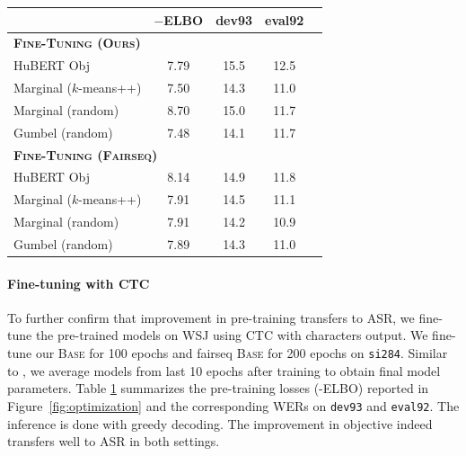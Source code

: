 \begin{table}[t]
\centering
{}
\label{tab:ctc}
\begin{threeparttable}
\footnotesize
\begin{tabularx}{0.94\linewidth}{lcccc}
  \toprule
     &$-$ELBO &dev93 &eval92\\[1pt]
  \midrule
  \multicolumn{3}{l}{\textbf{\textsc{Fine-Tuning (Ours)}}} &\\[1pt]
  HuBERT Obj               &7.79 &15.5 &12.5  \\
  Marginal ($k$-means++)     &7.50 &14.3 &11.0  \\
  Marginal (random)        &8.70 &15.0 &11.7  \\
  Gumbel (random)          &7.48 &14.1 &11.7  \\
  \midrule
  \multicolumn{3}{l}{\textbf{\textsc{Fine-Tuning (Fairseq)}}} &\\[1pt]
  HuBERT Obj               &8.14 &14.9 &11.8  \\
  Marginal ($k$-means++)     &7.91 &14.5 &11.1  \\
  Marginal (random)        &7.91 &14.2 &10.9  \\
  Gumbel (random)          &7.89 &14.3 &11.0  \\
  \bottomrule
\end{tabularx}
\end{threeparttable}
\end{table}


\paragraph{Fine-tuning with CTC}

%
%
To further confirm that improvement in pre-training transfers to ASR,
we fine-tune the pre-trained models on WSJ \citep{paul1992design} using CTC \citep{graves2006connectionist} with characters output. 
%
%
We fine-tune our \textsc{Base} for 100 epochs and fairseq \textsc{Base} for 200 epochs on \texttt{si284}.
%
%
%
Similar to \citet{lee2021intermediate,higuchi2020mask},
we average models from last 10 epochs after training to obtain final model parameters.
%
Table \ref{tab:ctc} summarizes the pre-training losses (-ELBO) reported in Figure~\ref{fig:optimization} and 
the corresponding WERs on \texttt{dev93} and \texttt{eval92}. The inference is done with greedy decoding.
%
%
%
The improvement in objective indeed transfers well to ASR in both settings.

